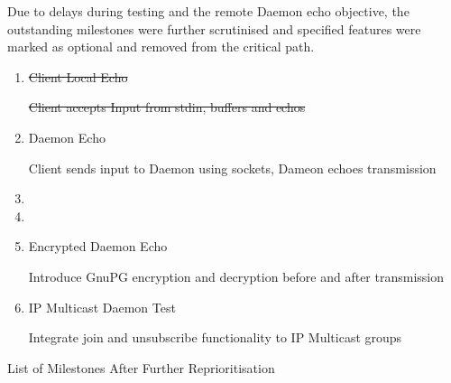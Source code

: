 Due to delays during testing and the remote Daemon echo objective, the 
outstanding milestones were further scrutinised and specified features
were marked as optional and removed from the critical path.


\begin{table}[Hbt]

\begin{center}

\begin{enumerate}

\item \sout{Client Local Echo}

	\subitem \sout{Client accepts Input from stdin, buffers and echos}

\item Daemon Echo 

	\subitem Client sends input to Daemon using sockets, Dameon 
	echoes transmission

\item {}

	\subitem {}

\item {}

	\subitem {}

\item Encrypted Daemon Echo 

	\subitem Introduce GnuPG encryption and decryption before and after 
	transmission 

\item IP Multicast Daemon Test

	\subitem Integrate join and unsubscribe functionality to IP Multicast
	groups

\end{enumerate}

\end{center}

\caption{List of Milestones After Further Reprioritisation}

\end{table}

